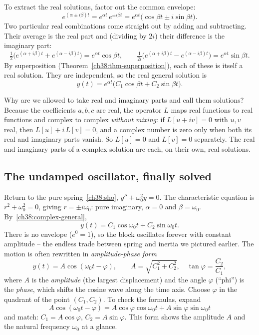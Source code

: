 To extract the real solutions, factor out the common envelope:
\[
  e^{(\alpha \pm i\beta)t} = e^{\alpha t}\, e^{\pm i\beta t}
  = e^{\alpha t}\big(\cos\beta t \pm i \sin\beta t\big).
\]
Two particular real combinations come straight out by adding and subtracting.
Their average is the real part and (dividing by $2i$) their difference is the
imaginary part:
\[
  \tfrac12\big(e^{(\alpha+i\beta)t} + e^{(\alpha-i\beta)t}\big)
  = e^{\alpha t}\cos\beta t,
  \qquad
  \tfrac{1}{2i}\big(e^{(\alpha+i\beta)t} - e^{(\alpha-i\beta)t}\big)
  = e^{\alpha t}\sin\beta t.
\]
By superposition (Theorem~\ref{ch38:thm-superposition}), each of these is itself
a real solution. They are independent, so the real general solution is
\begin{equation}
  \boxed{\,y(t) = e^{\alpha t}\big(C_1 \cos\beta t + C_2 \sin\beta t\big).\,}
  \label{ch38:complex-general}
\end{equation}

\begin{whybox}
Why are we allowed to take real and imaginary parts and call them solutions?
Because the coefficients $a, b, c$ are real, the operator $L$ maps real functions
to real functions and complex to complex \emph{without mixing}: if $L[u + iv] = 0$
with $u, v$ real, then $L[u] + i\,L[v] = 0$, and a complex number is zero only
when both its real and imaginary parts vanish. So $L[u] = 0$ and $L[v] = 0$
separately. The real and imaginary parts of a complex solution are each, on their
own, real solutions.
\end{whybox}

\subsection*{The undamped oscillator, finally solved}

Return to the pure spring~\eqref{ch38:sho}, $y'' + \omega_0^2 y = 0$. The
characteristic equation is $r^2 + \omega_0^2 = 0$, giving $r = \pm i\omega_0$:
pure imaginary, $\alpha = 0$ and $\beta = \omega_0$. By~\eqref{ch38:complex-general},
\[
  y(t) = C_1 \cos\omega_0 t + C_2 \sin\omega_0 t.
\]
There is no envelope ($e^{0} = 1$), so the block oscillates forever with constant
amplitude -- the endless trade between spring and inertia we pictured
earlier. The motion is often rewritten in \emph{amplitude-phase form}
\[
  y(t) = A\cos(\omega_0 t - \varphi),
  \qquad A = \sqrt{C_1^2 + C_2^2}, \quad \tan\varphi = \frac{C_2}{C_1},
\]
where $A$ is the \emph{amplitude} (the largest displacement) and the angle
$\varphi$ (``phi'') is the \emph{phase}, which shifts the cosine wave along the
time axis. Choose $\varphi$ in the quadrant of the point $(C_1, C_2)$. To check
the formulas, expand
\[
  A\cos(\omega_0 t-\varphi)=A\cos\varphi\cos\omega_0 t+A\sin\varphi\sin\omega_0 t
\]
and match: $C_1=A\cos\varphi$, $C_2=A\sin\varphi$. This form shows the
amplitude $A$ and the natural frequency $\omega_0$ at a
glance.

